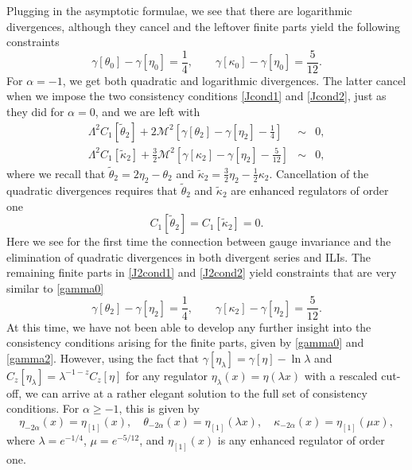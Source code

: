 \documentclass[12pt, letter]{article}
\def\be{\begin{equation}}
\def\ee{\end{equation}}
\newcommand{\M}{\mathcal{M}}
\begin{document}
Plugging in the asymptotic formulae, we see that  there are logarithmic divergences, although they cancel and the leftover finite parts yield the following constraints
\be \label{gamma0}
\gamma[\theta_0]-\gamma[\eta_0]=\frac14, \qquad \gamma[\kappa_0]-\gamma[\eta_0]=\frac{5}{12}.
\ee
For $\alpha=-1$, we get both quadratic and logarithmic divergences.  The latter cancel when  we impose the  two consistency conditions \eqref{Jcond1} and \eqref{Jcond2}, just as they did for $\alpha=0$, and we are left with
\begin{eqnarray}
\Lambda^2 C_1[\tilde \theta_{2}]+2\M^2\left[\gamma[\theta_2]-\gamma[\eta_2]-\frac14\right] &\sim& 0, \label{J2cond1} \\
\Lambda^2 C_1[\tilde \kappa_2]+\frac{3}{2} \M^2\left[\gamma[\kappa_2]-\gamma[\eta_2]-\frac{5}{12}\right]  &\sim & 0, \label{J2cond2}
\end{eqnarray}
where we recall that $\tilde \theta_{2}=2\eta_2-\theta_2$ and $\tilde \kappa_2=\frac32 \eta_2-\frac12 \kappa_2$.  Cancellation of the quadratic divergences requires that $\tilde \theta_2$ and $\tilde \kappa_2$ are enhanced regulators of order one
\be \label{C1eqn}
C_1[\tilde \theta_{2}]=C_1[\tilde \kappa_2]=0.
\ee
Here we see for the first time the connection between gauge invariance and the elimination of quadratic divergences in both divergent series and ILIs. The remaining finite parts in \eqref{J2cond1} and \eqref{J2cond2} yield constraints that are very similar to \eqref{gamma0}
\be \label{gamma2}
\gamma[\theta_2]-\gamma[\eta_2]=\frac14, \qquad \gamma[\kappa_2]-\gamma[\eta_2]=\frac{5}{12}.
\ee
At this time, we have not been able to develop any further insight into the consistency conditions arising for the finite parts, given by \eqref{gamma0} and \eqref{gamma2}. However, using the fact that $\gamma[\eta_\lambda]=\gamma[\eta]-\ln \lambda$ and $C_z[\eta_\lambda]=\lambda^{-1-z} C_z[\eta]$ for any regulator $\eta_\lambda(x)=\eta(\lambda x)$ with a rescaled cut-off, we can arrive at a rather elegant solution to the full set of consistency conditions. For $\alpha \geq -1$, this is given by
\be
\eta_{-2\alpha}(x)=\eta_{[1]}(x), \quad \theta_{-2\alpha}(x)=\eta_{[1]}(\lambda x), \quad \kappa_{-2\alpha}(x)=\eta_{[1]}(\mu x),
\ee
where $\lambda=e^{-1/4}$, $\mu=e^{-5/12}$, and $\eta_{[1]}(x)$ is any enhanced regulator of order one. 
\end{document}
